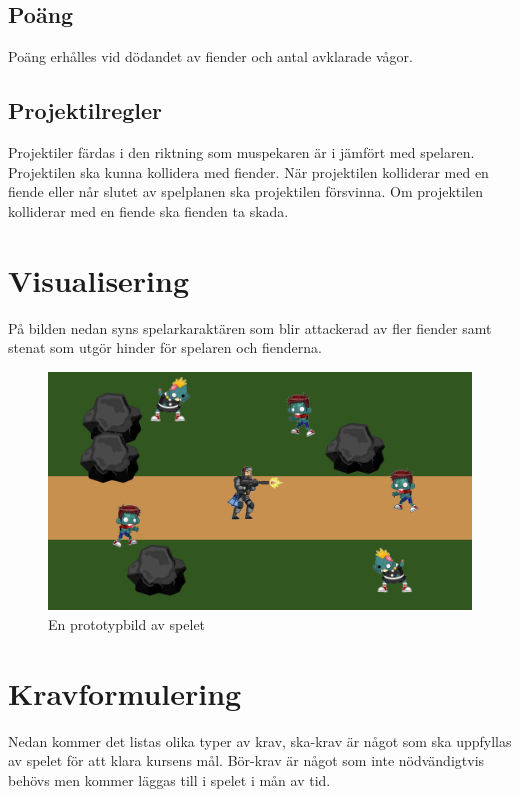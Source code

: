 \documentclass{TDP005mall}
\begin{document}
  \subsection{Poäng}
  Poäng erhålles vid dödandet av fiender och antal avklarade vågor.

  \subsection{Projektilregler}
  Projektiler färdas i den riktning som muspekaren är i jämfört med spelaren.
  Projektilen ska kunna kollidera med fiender.
  När projektilen kolliderar med en fiende eller når slutet av spelplanen ska projektilen försvinna.
  Om projektilen kolliderar med en fiende ska fienden ta skada.

  \section{Visualisering}

  På bilden nedan syns spelarkaraktären som blir attackerad av fler fiender samt stenat som utgör hinder för spelaren och fienderna.

  \begin{figure}[H]
    \includegraphics[width=\linewidth]{test.png}
    \caption {En prototypbild av spelet}
    \label {fig:picture}
  \end {figure}

  \section{Kravformulering}
  Nedan kommer det listas olika typer av krav, ska-krav är något som ska uppfyllas av spelet för att klara kursens mål. Bör-krav är något som inte nödvändigtvis behövs men kommer läggas till i spelet i mån av tid.
\end{document}
